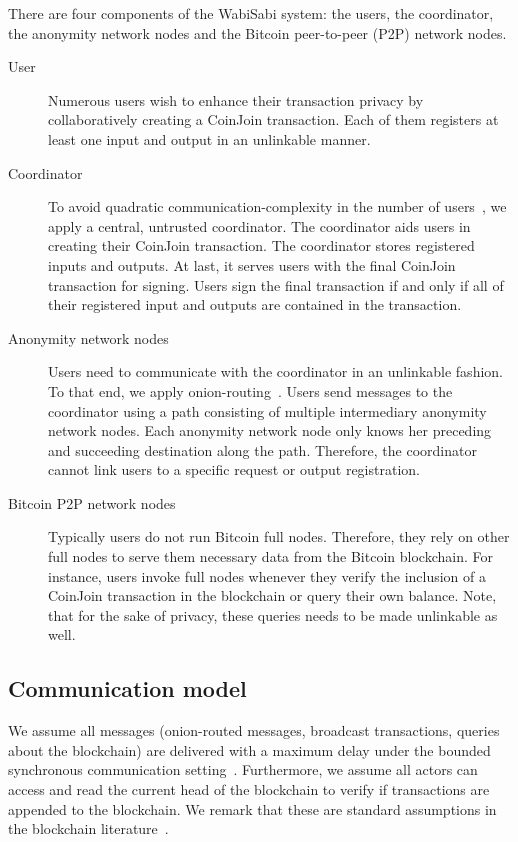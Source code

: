 \documentclass[a4paper]{article}
\begin{document}
There are four components of the WabiSabi system: the users, the coordinator, the anonymity network nodes and the Bitcoin peer-to-peer (P2P) network nodes.
\begin{description}
    \item[User] Numerous users wish to enhance their transaction privacy by collaboratively creating a CoinJoin transaction. Each of them registers at least one input and output in an unlinkable manner.
    \item[Coordinator] To avoid quadratic communication-complexity in the number of users~\cite{ruffing2014coinshuffle}, we apply a central, untrusted coordinator. The coordinator aids users in creating their CoinJoin transaction. The coordinator stores registered inputs and outputs. At last, it serves users with the final CoinJoin transaction for signing. Users sign the final transaction if and only if all of their registered input and outputs are contained in the transaction.
    \item[Anonymity network nodes] Users need to communicate with the coordinator in an unlinkable fashion. To that end, we apply onion-routing~\cite{reed1998anonymous}. Users send messages to the coordinator using a path consisting of multiple intermediary anonymity network nodes. Each anonymity network node only knows her preceding and succeeding destination along the path. Therefore, the coordinator cannot link users to a specific request or output registration.
    \item[Bitcoin P2P network nodes] Typically users do not run Bitcoin full nodes. Therefore, they rely on other full nodes to serve them necessary data from the Bitcoin blockchain. For instance, users invoke full nodes whenever they verify the inclusion of a CoinJoin transaction in the blockchain or query their own balance. Note, that for the sake of privacy, these queries needs to be made unlinkable as well.
\end{description}

\subsection{Communication model} \label{sec:commodel}
We assume all messages (onion-routed messages, broadcast transactions, queries about the blockchain) are delivered with a maximum delay under the bounded synchronous communication setting~\cite{attiya2004distributed}. Furthermore, we assume all actors
can access and read the current head of the blockchain
to verify if transactions are appended to the blockchain.
We remark that these are standard assumptions in the
blockchain literature~\cite{badertscher2017bitcoin}.
\end{document}
